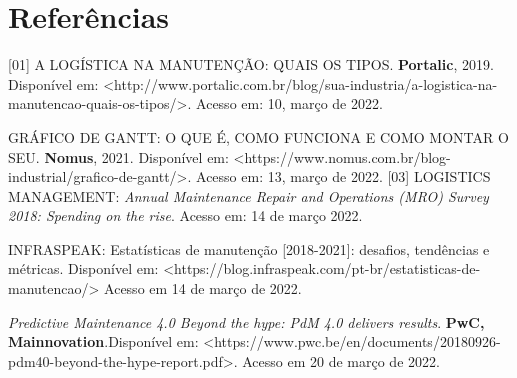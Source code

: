 \documentclass[%
  a4paper,%
  12pt,%
  english,%
  brazilian,%
]{article}
\begin{document}
\section{Referências}%
[01] A LOGÍSTICA NA MANUTENÇÃO: QUAIS OS TIPOS. \textbf{Portalic}, 2019. Disponível em: <http://www.portalic.com.br/blog/sua-industria/a-logistica-na-manutencao-quais-os-tipos/>. Acesso em: 10, março de 2022.\par
[02] GRÁFICO DE GANTT: O QUE É, COMO FUNCIONA E COMO MONTAR O SEU. \textbf{Nomus}, 2021. Disponível em: <https://www.nomus.com.br/blog-industrial/grafico-de-gantt/>. Acesso em: 13, março de 2022.
[03] LOGISTICS MANAGEMENT: \textit{Annual Maintenance Repair and Operations (MRO) Survey 2018: Spending on the rise}. Acesso em: 14 de março 2022.\par
[04] INFRASPEAK: Estatísticas de manutenção [2018-2021]: desafios, tendências e métricas. Disponível em: <https://blog.infraspeak.com/pt-br/estatisticas-de-manutencao/> Acesso em 14 de março de 2022.\par
[05]\textit{Predictive Maintenance 4.0 Beyond the hype: PdM 4.0 delivers results}. \textbf{PwC, Mainnovation}.Disponível em: <https://www.pwc.be/en/documents/20180926-pdm40-beyond-the-hype-report.pdf>. Acesso em 20 de março de 2022.

\end{document}

